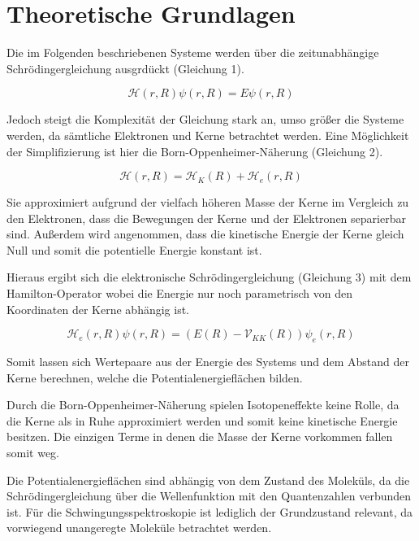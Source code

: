 %
%

\section{Theoretische Grundlagen}

Die im Folgenden beschriebenen Systeme werden über die zeitunabhängige Schrödingergleichung ausgrdückt (Gleichung 1). 

\begin {equation}
\mathcal{H}\left(r,R\right)\psi\left(r,R\right)=E\psi\left(r,R\right)
\end {equation}

Jedoch steigt die Komplexität der Gleichung stark an, umso größer die Systeme werden, da sämtliche Elektronen und Kerne betrachtet werden. Eine Möglichkeit der Simplifizierung ist hier die Born-Oppenheimer-Näherung (Gleichung 2). 

\begin {equation}
\mathcal{H}\left(r,R\right)=\mathcal{H}_{K}\left(R\right)+\mathcal{H}_{e}\left(r,R\right)
\end {equation}

Sie approximiert aufgrund der vielfach höheren Masse der Kerne im Vergleich zu den Elektronen, dass die Bewegungen der Kerne und der Elektronen separierbar sind. Außerdem wird angenommen, dass die kinetische Energie der Kerne gleich Null und somit die potentielle Energie konstant ist.

Hieraus ergibt sich die elektronische Schrödingergleichung (Gleichung 3) mit dem Hamilton-Operator wobei die Energie nur noch parametrisch von den Koordinaten der Kerne abhängig ist.

\begin {equation}
\mathcal{H}_e\left(r,R\right)\psi\left(r,R\right)=\left(E\left(R\right)-\mathcal{V}_{KK}\left(R\right)\right)\psi_e\left(r,R\right)
\end {equation}

 Somit lassen sich Wertepaare aus der Energie des Systems und dem Abstand der Kerne berechnen, welche die Potentialenergieflächen bilden.

Durch die Born-Oppenheimer-Näherung spielen Isotopeneffekte keine Rolle, da die Kerne als in Ruhe approximiert werden und somit keine kinetische Energie besitzen. Die einzigen Terme in denen die Masse der Kerne vorkommen fallen somit weg.

Die Potentialenergieflächen sind abhängig von dem Zustand des Moleküls, da die Schrödingergleichung über die Wellenfunktion mit den Quantenzahlen verbunden ist. Für die Schwingungsspektroskopie ist lediglich der Grundzustand relevant, da vorwiegend unangeregte Moleküle betrachtet werden.


%